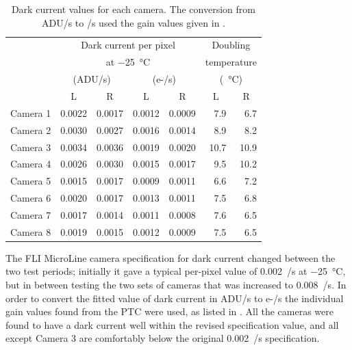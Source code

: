 \begin{colsection}
\begin{colsection}
\begin{table}[t]
    \begin{center}
        \begin{tabular}{c|cc|cc|rr} %
             &
            \multicolumn{4}{c|}{Dark current per pixel} &
            \multicolumn{2}{c}{Doubling} \\
             &
            \multicolumn{4}{c|}{at \SI{-25}{\celsius}} &
            \multicolumn{2}{c}{temperature} \\
             &
            \multicolumn{2}{c|}{(ADU/s)} &
            \multicolumn{2}{c|}{(e-/s)} &
            \multicolumn{2}{c}{(\SI{}{\celsius})} \\
             & L & R & L & R &
             \multicolumn{1}{c}{L} & \multicolumn{1}{c}{R} \\
            \midrule
            Camera 1 & 0.0022 & 0.0017 & 0.0012 & 0.0009 &  7.9 &  6.7 \\
            Camera 2 & 0.0030 & 0.0027 & 0.0016 & 0.0014 &  8.9 &  8.2 \\
            Camera 3 & 0.0034 & 0.0036 & 0.0019 & 0.0020 & 10.7 & 10.9 \\
            Camera 4 & 0.0026 & 0.0030 & 0.0015 & 0.0017 &  9.5 & 10.2 \\
            Camera 5 & 0.0015 & 0.0017 & 0.0009 & 0.0011 &  6.6 &  7.2 \\
            Camera 6 & 0.0020 & 0.0017 & 0.0013 & 0.0011 &  7.5 &  6.8 \\
            Camera 7 & 0.0017 & 0.0014 & 0.0011 & 0.0008 &  7.6 &  6.5 \\
            Camera 8 & 0.0019 & 0.0015 & 0.0012 & 0.0009 &  7.5 &  6.5 \\
        \end{tabular}
    \end{center}
    \caption[Dark current values]{
        Dark current values for each camera. The conversion from ADU/s to \elec/s used the gain values given in .
    }\label{tab:dc}
\end{table}

The FLI MicroLine camera specification for dark current changed between the two test periods; initially it gave a typical per-pixel value of 0.002~\elec/s at \SI{-25}{\celsius}, but in between testing the two sets of cameras that was increased to 0.008~\elec/s. In order to convert the fitted value of dark current in ADU/s to e-/s the individual gain values found from the PTC were used, as listed in . All the cameras were found to have a dark current well within the revised specification value, and all except Camera 3 are comfortably below the original 0.002~\elec/s specification.


\end{colsection}
\end{colsection}
